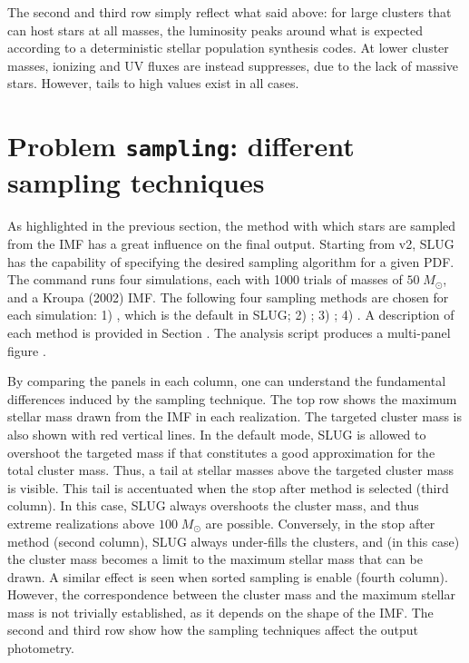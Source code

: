 \documentclass[letterpaper,10pt,english]{sphinxmanual}
\begin{document}
The second and third row simply reflect what said above: for large clusters that can host
stars at all masses, the luminosity peaks around what is expected according to a deterministic
stellar population synthesis codes. At lower cluster masses, ionizing and UV fluxes
are instead suppresses, due to the lack of massive stars. However, tails to high values exist
in all cases.


\section{Problem \texttt{sampling}: different sampling techniques}
\label{tests:problem-sampling-different-sampling-techniques}
As highlighted in the previous section, the method with which stars are sampled from the
IMF has a great influence on the final output. Starting from v2, SLUG has the capability of
specifying the desired sampling algorithm for a given PDF.
The command   runs four  simulations, each with 1000 trials
of masses of \(50\;M_\odot\), and a Kroupa (2002) IMF.
The following four sampling methods are chosen for each simulation: 1) ,
which is the default in SLUG; 2) ; 3) ; 4) .
A description of each method is provided in Section {\hyperref[pdfs:sampling-metod-label]{\emph{}}}.
The analysis script  produces a multi-panel
figure .

By comparing the panels in each column, one can understand the fundamental differences
induced by the sampling technique. The top row shows the maximum stellar mass drawn from the
IMF in each realization. The targeted cluster mass is also shown with red vertical lines.
In the default mode, SLUG is allowed to overshoot the targeted mass if that constitutes
a good approximation for the total cluster mass. Thus, a tail at stellar masses above the
targeted cluster mass is visible. This tail is accentuated when the stop after method
is selected (third column). In this case, SLUG always overshoots the cluster mass, and thus
extreme realizations above \(100\;M_\odot\)  are possible. Conversely, in the
stop after method (second column), SLUG always under-fills the clusters, and (in this case)
the cluster mass becomes a limit to the maximum stellar mass that can be drawn. A similar effect
is seen when sorted sampling is enable (fourth column). However, the correspondence between the
cluster mass and the maximum stellar mass is not trivially established, as it depends on the
shape of the IMF. The second and third row show how the sampling techniques affect the output
photometry.
\end{document}
